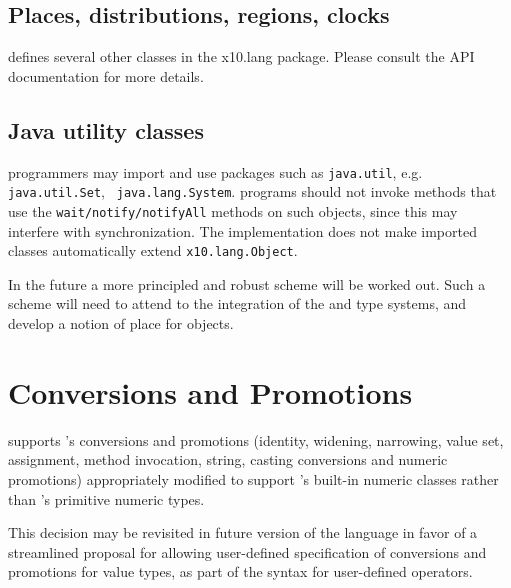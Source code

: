 \subsection{Places, distributions, regions, clocks}
\Xten{} defines several other classes in the {\cf x10.lang}
package. Please consult the API documentation for more details.

\subsection{Java utility classes}
\XtenCurrVer{} programmers may import and use \java{} packages such as
{\tt java.util}, e.g.{} {\tt java.util.Set}, {\tt
java.lang.System}. \Xten{} programs should not invoke methods
that use the {\tt wait/notify/notifyAll} methods on such objects,
since this may interfere with \Xten{} synchronization. The
implementation does not make imported \java{} classes
automatically extend {\tt x10.lang.Object}. 


In the future a more principled and robust scheme will be worked
out. Such a scheme will need to attend to the integration of the
\java{} and \Xten{} type systems, and develop a notion of place for 
\java{} objects.

\cbend
\section{Conversions and Promotions}\label{XtenConversions}\label{XtenPromotions}

{}\XtenCurrVer{} supports \java's conversions and promotions
(identity, widening, narrowing, value set, assignment, method
invocation, string, casting conversions and numeric promotions)
appropriately modified to support \Xten's built-in numeric classes
rather than \java's primitive numeric types.

This decision may be revisited in future version of the language in
favor of a streamlined proposal for allowing user-defined
specification of conversions and promotions for value types, as part
of the syntax for user-defined operators.
